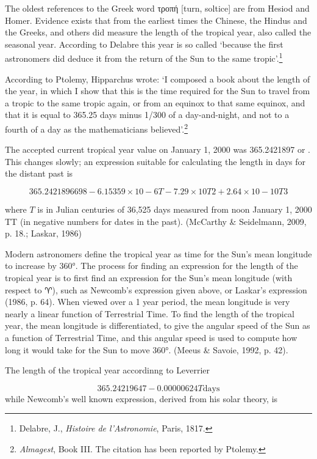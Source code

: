 The oldest references to the Greek word τροπή [turn, soltice] are from Hesiod and Homer. Evidence
exists that from the earliest times the Chinese, the Hindus and the Greeks, and others did measure the
length of the tropical year, also called the seasonal year. According to Delabre this year is so called
`because the first astronomers did deduce it from the return of the Sun to the same tropic’.\footnote{Delabre, J., \textit{Histoire de l’Astronomie}, Paris, 1817.}

According to Ptolemy, Hipparchus wrote: `I composed a book about the length of the year, in which
I show that this is the time required for the Sun to travel from a tropic to the same tropic again, or from
an equinox to that same equinox, and that it is equal to 365.25 days minus 1/300 of a day-and-night, and not to a fourth of a day as the mathematicians believed’.\footnote{\textit{Almagest}, Book III. The citation has been reported by Ptolemy.}


The accepted current tropical year value on January 1, 2000 was 365.2421897 or  . This changes slowly; an expression suitable for calculating the length in days for the distant past is

\begin{equation}
365.2421896698 - 6.15359×10-6T- 7.29\times10T2 + 2.64 \times10 -10 T3
\end{equation}


where $T$ is in Julian centuries of 36,525 days measured from noon January 1, 2000 TT (in negative numbers for dates in the past). (McCarthy \& Seidelmann, 2009, p. 18.; Laskar, 1986)

Modern astronomers define the tropical year as time for the Sun's mean longitude to increase by 360°. The process for finding an expression for the length of the tropical year is to first find an expression for the Sun's mean longitude (with respect to ♈), such as Newcomb's expression given above, or Laskar's expression (1986, p. 64). When viewed over a 1 year period, the mean longitude is very nearly a linear function of Terrestrial Time. To find the length of the tropical year, the mean longitude is differentiated, to give the angular speed of the Sun as a function of Terrestrial Time, and this angular speed is used to compute how long it would take for the Sun to move 360°. (Meeus \& Savoie, 1992, p. 42).

The length of the tropical year accordinng to Leverrier

\begin{equation}
365.24219647 - 0.00000624 T \text{days}
\end{equation}
while Newcomb's well known expression, derived from his solar theory, is

